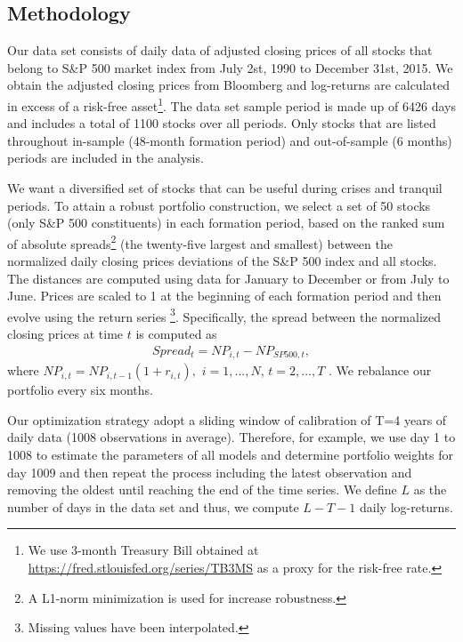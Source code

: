 \documentclass[a4paper,12pt]{report}
\begin{document}
\begin{refsection}
\vspace{0.6cm}

\section{Methodology}

Our data set consists of daily data of adjusted closing prices of all stocks
that belong to S\&P 500 market index from July 2st, 1990 to December 31st,
2015. We obtain the adjusted closing prices from Bloomberg and
log-returns are calculated in excess of a risk-free asset\footnote{%
	We use 3-month Treasury Bill obtained at %
	\url{https://fred.stlouisfed.org/series/TB3MS} as a proxy for the risk-free
	rate.}. The data set sample period is made up of 6426 days and includes a
total of 1100 stocks over all periods. Only stocks that are listed
throughout in-sample (48-month formation period) and out-of-sample (6
months) periods are included in the analysis.

We want a diversified set of stocks that can be useful during crises and
tranquil periods. To attain a robust portfolio construction, we select a set of 50 stocks (only S\&P 500 constituents) in
each formation period, based on the ranked sum of absolute spreads\footnote{A L1-norm minimization is used for increase robustness.} (the twenty-five largest and smallest) between the normalized
daily closing prices deviations of the
S\&P 500 index and all stocks. The distances are computed using data for January
to December or from July to June. Prices are scaled to 1 at the beginning of
each formation period and then evolve using the return series \footnote{%
	Missing values have been interpolated.}. Specifically, the spread between
the normalized closing prices at time $t$ is computed as
\begin{equation}
\begin{aligned} Spread_{t}=NP_{i,t}-NP_{SP500,t}, \end{aligned}
\label{eq:eq01}
\end{equation}%
where $NP_{i,t}=NP_{i,t-1}\left( 1+r_{i,t}\right) ,$ $i=1,...,N$, $t=2,...,T$%
. We rebalance our portfolio every six months.

Our optimization strategy adopt a sliding window of calibration of T=4 years of daily data (1008 observations in average). Therefore, for example, we use day 1 to 1008 to
estimate the parameters of all models and determine portfolio weights for
day 1009 and then repeat the process including the latest observation and
removing the oldest until reaching the end of the time series. We define $L$
as the number of days in the data set and thus, we compute $L-T-1$ daily
log-returns.



\end{refsection}
\end{document}
